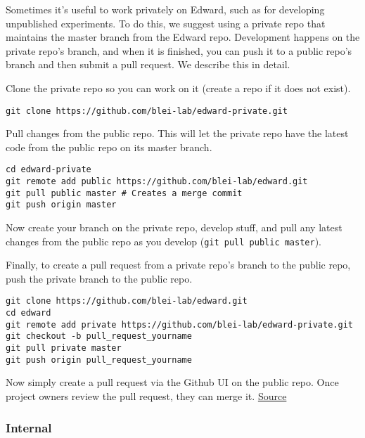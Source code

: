 Sometimes it's useful to work privately on Edward, such as for
developing unpublished experiments.
To do this, we suggest using a private repo
that maintains the master branch from the Edward repo. Development
happens on the private repo's branch, and when it is finished, you can
push it to a public repo's branch and then submit a pull request. We
describe this in detail.

Clone the private repo so you can work on it (create a repo if it does
not exist).

\begin{lstlisting}[class=JSON]
git clone https://github.com/blei-lab/edward-private.git
\end{lstlisting}

Pull changes from the public repo. This will let the private repo have
the latest code from the public repo on its master branch.

\begin{lstlisting}[class=JSON]
cd edward-private
git remote add public https://github.com/blei-lab/edward.git
git pull public master # Creates a merge commit
git push origin master
\end{lstlisting}

Now create your branch on the private repo, develop stuff, and pull any
latest changes from the public repo as you develop
(\texttt{git\ pull\ public\ master}).

Finally, to create a pull request from a private repo's branch to the
public repo, push the private branch to the public repo.

\begin{lstlisting}[class=JSON]
git clone https://github.com/blei-lab/edward.git
cd edward
git remote add private https://github.com/blei-lab/edward-private.git
git checkout -b pull_request_yourname
git pull private master
git push origin pull_request_yourname
\end{lstlisting}

Now simply create a pull request via the Github UI on the public repo.
Once project owners review the pull request, they can merge it.
\href{http://stackoverflow.com/questions/10065526/github-how-to-make-a-fork-of-public-repository-private/30352360\#30352360}{Source}

\subsubsection{Internal}

